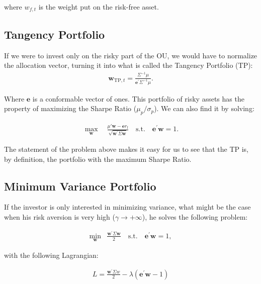 \documentclass[12pt,oneside,a4paper]{memoir}
\begin{document}
\noindent
where \(w_{f,t}\) is the weight put on the risk-free asset.

\subsection{Tangency Portfolio}

If we were to invest only on the risky part of the OU, we would have to normalize the allocation vector, turning it into what is called the Tangency Portfolio (TP):
\begin{align}
\label{tp}
\mathbf{w}_{\mathrm{TP},t} = \frac{\Sigma^{-1} \mu}{\mathbf{e}^{\prime} \Sigma^{-1} \mu} .
\end{align}

\noindent
Where $\mathbf{e}$ is a conformable vector of ones. This portfolio of risky assets has the property of maximizing the Sharpe Ratio ($\mu_p/\sigma_p$).
We can also find it by solving:

\vspace{-12pt}
\begin{align}\label{max:sr}
	\max_{\mathbf{w}} \quad \frac{\mu'\mathbf{w} - \mathbf{e} r_{\textrm{f}}}{\sqrt{\mathbf{w}^{\prime}\Sigma \mathbf{w}}}
	\quad
	\text{s.t.} \quad \mathbf{e}^{\prime} \mathbf{w} = 1.
\end{align}

\noindent
The statement of the problem above makes it easy for us to see that the TP is, by definition, the portfolio with the maximum Sharpe Ratio.

\subsection{Minimum Variance Portfolio}

If the investor is only interested in minimizing variance, what might be the case when his risk aversion is very high ($\gamma \to + \infty$), he solves the following problem:

\begin{align}
\label{gmv:prob}
	\min_{\mathbf{w}}  & \frac{\mathbf{w}^{\prime} \Sigma \mathbf{w}}{2} \quad
\mathrm{s.t.} \quad \mathbf{e}^{\prime}\mathbf{w} = 1,
\end{align}

\noindent
with the following Lagrangian:

\vspace{-1 em}
\begin{align} \label{L:gmv}
	L=\frac{\mathbf{w}^{\prime} \Sigma w}{2} - \lambda(\mathbf{e}^{\prime}\mathbf{w} - 1)
\end{align}
\end{document}
